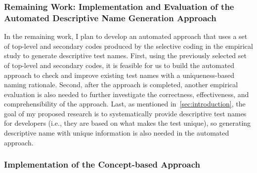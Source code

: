 \subsubsection{Remaining Work: Implementation and Evaluation of the Automated Descriptive Name Generation Approach}
\label{sec:remaining-work}

In the remaining work, I plan to develop an automated approach that uses a set of top-level and secondary codes produced by the selective coding in the empirical study to generate descriptive test names.
%
First, using the previously selected set of top-level and secondary codes, it is feasible for us to build the automated approach to check and improve existing test names with a uniqueness-based naming rationale.
%
Second, after the approach is completed, another empirical evaluation is also needed to further investigate the correctness, effectiveness, and comprehensibility of the approach.
%
Last, as mentioned in~\cref{sec:introduction}, the goal of my proposed research is to systematically provide descriptive test names for developers (i.e., they are based on what makes the test unique), so generating descriptive name with unique information is also needed in the automated approach.

\subsubsection{Implementation of the Concept-based Approach}

